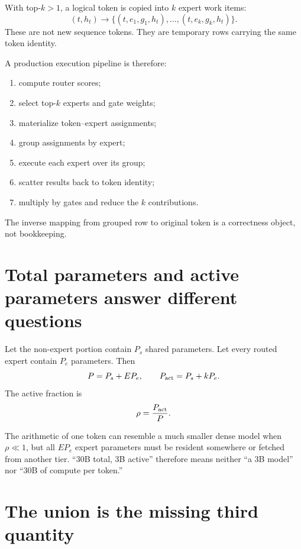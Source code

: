 With top-$k>1$, a logical token is copied into $k$ expert work items:
\[
(t,h_t)\longrightarrow
\{(t,e_1,g_1,h_t),\ldots,(t,e_k,g_k,h_t)\}.
\]
These are not new sequence tokens. They are temporary rows carrying the same token
identity.

A production execution pipeline is therefore:

\begin{enumerate}
\item compute router scores;
\item select top-$k$ experts and gate weights;
\item materialize token--expert assignments;
\item group assignments by expert;
\item execute each expert over its group;
\item scatter results back to token identity;
\item multiply by gates and reduce the $k$ contributions.
\end{enumerate}

The inverse mapping from grouped row to original token is a correctness object, not
bookkeeping.


\section{Total parameters and active parameters answer different questions}

Let the non-expert portion contain $P_s$ shared parameters. Let every routed expert
contain $P_e$ parameters. Then
\[
P=P_s+EP_e,
\qquad
P_{\rm act}=P_s+kP_e.
\]
The active fraction is
\[
\rho=\frac{P_{\rm act}}{P}.
\]

The arithmetic of one token can resemble a much smaller dense model when $\rho\ll1$,
but all $EP_e$ expert parameters must be resident somewhere or fetched from another
tier. ``30B total, 3B active'' therefore means neither ``a 3B model'' nor ``30B of
compute per token.''

\section{The union is the missing third quantity}

